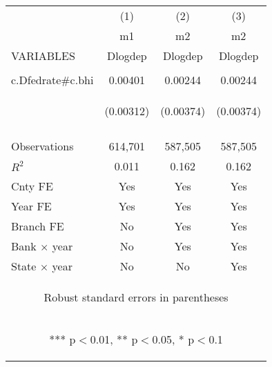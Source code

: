 \begin{center}
\begin{tabular}{lccc} \hline
 & (1) & (2) & (3) \\
 & m1 & m2 & m2 \\
VARIABLES & Dlogdep & Dlogdep & Dlogdep \\ \hline
\vspace{4pt} & \begin{footnotesize}\end{footnotesize} & \begin{footnotesize}\end{footnotesize} & \begin{footnotesize}\end{footnotesize} \\
c.Dfedrate\#c.bhi & 0.00401 & 0.00244 & 0.00244 \\
 & \begin{footnotesize}(0.00312)\end{footnotesize} & \begin{footnotesize}(0.00374)\end{footnotesize} & \begin{footnotesize}(0.00374)\end{footnotesize} \\
\vspace{4pt} & \begin{footnotesize}\end{footnotesize} & \begin{footnotesize}\end{footnotesize} & \begin{footnotesize}\end{footnotesize} \\
Observations & 614,701 & 587,505 & 587,505 \\
$R^2$ & 0.011 & 0.162 & 0.162 \\
Cnty FE & Yes & Yes & Yes \\
Year FE & Yes & Yes & Yes \\
Branch FE & No & Yes & Yes \\
Bank $\times$ year & No & Yes & Yes \\
 State $\times $ year & No & No & Yes \\ \hline
\multicolumn{4}{c}{\begin{footnotesize} Robust standard errors in parentheses\end{footnotesize}} \\
\multicolumn{4}{c}{\begin{footnotesize} *** p$<$0.01, ** p$<$0.05, * p$<$0.1\end{footnotesize}} \\
\end{tabular}
\end{center}
